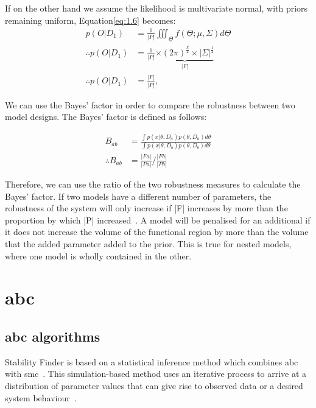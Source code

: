 If on the other hand we assume the likelihood is multivariate normal, with priors remaining uniform, Equation\ref{eq:1.6} becomes: 
\begin{align}
p(O|D_1) &= \frac{1}{|P|}\iiint_{\underline{\Theta}}f(\underline{\Theta};\mu,\Sigma)d\underline{\Theta} \\%
\therefore p(O|D_1) &= \frac{1}{|P|}\underbrace{\times(2\pi)^\frac{k}{2}\times |\Sigma|^\frac{1}{2}}_{|F|} \\
\therefore p(O|D_1) &= \frac{|F|}{|P|},
\end{align}

We can use the Bayes' factor in order to compare the robustness between two model designs. The Bayes' factor is defined as follows:

\begin{align}
B_{ab} &= \frac{\displaystyle \int p(x|\theta, D_a)p(\theta, D_a)d\theta}{\displaystyle \int p(x|\theta, D_b)p(\theta, D_b)d\theta} \\
\therefore B_{ab} &= \frac{|Fa|}{|Pa|} / \frac{|Fb|}{|Pb|} \label{eq:final_bayes}
\end{align}

\noindent Therefore, we can use the ratio of the two robustness measures to calculate the Bayes' factor. If two models have a different number of parameters, the robustness of the system will only increase if |F| increases by more than the proportion by which |P| increased~\autocite{Woods:2016eh}. A model will be penalised for an additional if it does not increase the volume of the functional region by more than the volume that the added parameter added to the prior. This is true for nested models, where one model is wholly contained in the other. 



\section{\acrfull{abc}}
\subsection{\acrshort{abc} algorithms}

Stability Finder is based on a statistical inference method which combines \acrshort{abc} with \acrfull{smc}~\autocite{Toni:2009tr}. This simulation-based method uses an iterative process to arrive at a distribution of parameter values that can give rise to observed data or a desired system behaviour~\autocite{Barnes:2011hh}.

